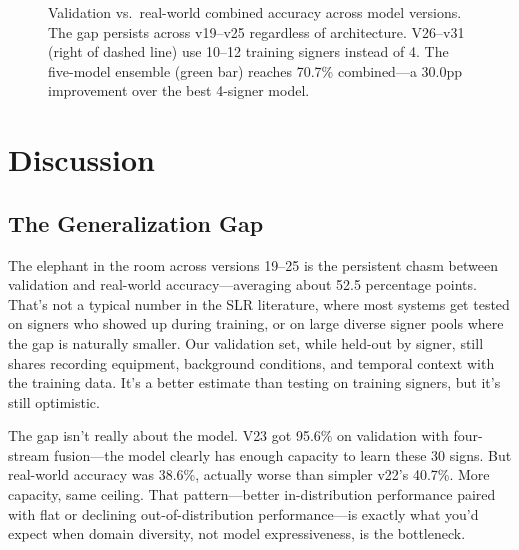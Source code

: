 \documentclass[conference]{IEEEtran}
\begin{document}
\begin{figure}[t]
    \caption{Validation vs.\ real-world combined accuracy across model versions. The gap persists across v19--v25 regardless of architecture. V26--v31 (right of dashed line) use 10--12 training signers instead of 4. The five-model ensemble (green bar) reaches 70.7\% combined---a 30.0pp improvement over the best 4-signer model.}
    \label{fig:gap}
\end{figure}

\section{Discussion}

\subsection{The Generalization Gap}

The elephant in the room across versions 19--25 is the persistent chasm between validation and real-world accuracy---averaging about 52.5 percentage points. That's not a typical number in the SLR literature, where most systems get tested on signers who showed up during training, or on large diverse signer pools where the gap is naturally smaller. Our validation set, while held-out by signer, still shares recording equipment, background conditions, and temporal context with the training data. It's a better estimate than testing on training signers, but it's still optimistic.

The gap isn't really about the model. V23 got 95.6\% on validation with four-stream fusion---the model clearly has enough capacity to learn these 30 signs. But real-world accuracy was 38.6\%, actually worse than simpler v22's 40.7\%. More capacity, same ceiling. That pattern---better in-distribution performance paired with flat or declining out-of-distribution performance---is exactly what you'd expect when domain diversity, not model expressiveness, is the bottleneck.
\end{document}
